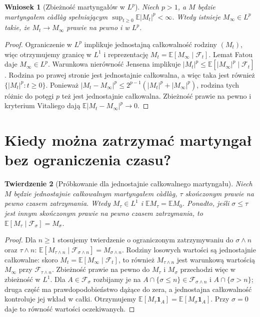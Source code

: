 \documentclass[11pt,a4paper,oneside]{report}
\numberwithin{equation}{chapter}
\theoremstyle{plain}
\newtheorem{twierdzenie}{Twierdzenie}[chapter]
\newtheorem{wniosek}[twierdzenie]{Wniosek}
\theoremstyle{definition}
\theoremstyle{remark}
\newcommand{\E}{\mathbb{E}}
\newcommand{\calF}{\mathcal{F}}
\newcommand{\ind}[1]{\mathbf{1}_{#1}}
\begin{document}
\begin{wniosek}[Zbieżność martyngałów w $L^p$]
Niech $p>1$, a $M$ będzie martyngałem c\`adl\`ag
spełniającym $\sup_{t\ge0}\E|M_t|^p<\infty$.
Wtedy istnieje $M_\infty\in L^p$ takie, że
$M_t\to M_\infty$ prawie na pewno i w $L^p$.
\end{wniosek}
\begin{proof}
Ograniczenie w $L^p$ implikuje jednostajną całkowalność
rodziny $(M_t)$, więc otrzymujemy granicę w $L^1$
i reprezentację $M_t=\E[M_\infty\mid\calF_t]$.
Lemat Fatou daje $M_\infty\in L^p$.
Warunkowa nierówność Jensena implikuje
$|M_t|^p\le\E[|M_\infty|^p\mid\calF_t]$.
Rodzina po prawej stronie jest jednostajnie całkowalna,
a więc taka jest również $\{|M_t|^p:t\ge0\}$.
Ponieważ $|M_t-M_\infty|^p\le2^{p-1}
(|M_t|^p+|M_\infty|^p)$, rodzina tych różnic do
potęgi $p$ też jest jednostajnie całkowalna.
Zbieżność prawie na pewno i kryterium Vitaliego dają
$\E|M_t-M_\infty|^p\to0$.
\end{proof}

\section{Kiedy można zatrzymać martyngał bez ograniczenia czasu?}
\begin{twierdzenie}[Próbkowanie dla jednostajnie całkowalnego martyngału]
Niech $M$ będzie jednostajnie całkowalnym martyngałem
c\`adl\`ag, $\tau$ skończonym prawie na pewno czasem
zatrzymania. Wtedy $M_\tau\in L^1$ i
$\E M_\tau=\E M_0$. Ponadto, jeśli $\sigma\le\tau$
jest innym skończonym prawie na pewno czasem zatrzymania,
to $\E[M_\tau\mid\calF_\sigma]=M_\sigma$.
\end{twierdzenie}
\begin{proof}
Dla $n\ge1$ stosujemy twierdzenie o ograniczonym
zatrzymywaniu do $\sigma\wedge n$ oraz $\tau\wedge n$:
$\E[M_{\tau\wedge n}\mid\calF_{\sigma\wedge n}]
=M_{\sigma\wedge n}$. Rodziny losowych wartości są
jednostajnie całkowalne: skoro
$M_t=\E[M_\infty\mid\calF_t]$,
to również $M_{\tau\wedge n}$ jest warunkową wartością
$M_\infty$ przy $\calF_{\tau\wedge n}$.
Zbieżność prawie na pewno do $M_\tau$ i $M_\sigma$
przechodzi więc w zbieżność w $L^1$.
Dla $A\in\calF_\sigma$ rozbijamy je na
$A\cap\{\sigma\le n\}\in\calF_{\sigma\wedge n}$
i $A\cap\{\sigma>n\}$; druga część ma
prawdopodobieństwo dążące do zera, a jednostajna
całkowalność kontroluje jej wkład w całki.
Otrzymujemy $\E[M_\tau\ind A]=\E[M_\sigma\ind A]$.
Przy $\sigma=0$ daje to równość wartości oczekiwanych.
\end{proof}
\end{document}
